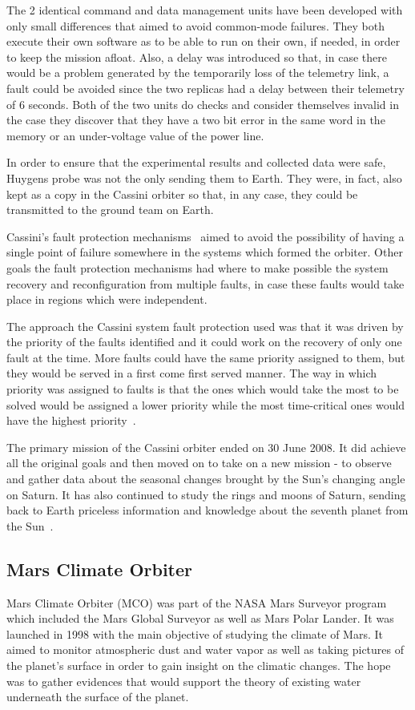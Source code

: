 The 2 identical command and data management units have been developed with only
small differences that aimed to avoid common-mode failures. They both execute
their own software as to be able to run on their own, if needed, in order to
keep the mission afloat. Also, a delay was introduced so that, in case there
would be a problem generated by the temporarily loss of the telemetry link, a
fault could be avoided since the two replicas had a delay between their telemetry
of 6 seconds. Both of the two units do checks and consider themselves invalid in
the case they discover that they have a two bit error in the same word in the
memory or an under-voltage value of the power line.

In order to ensure that the experimental results and collected data were safe,
Huygens probe was not the only sending them to Earth. They were, in fact, also
kept as a copy in the Cassini orbiter so that, in any case, they could be
transmitted to the ground team on Earth.

Cassini's fault protection mechanisms~\cite{cassini} aimed to avoid the
possibility of having a single point of failure somewhere in the systems which
formed the orbiter. Other goals the fault protection mechanisms had where to
make possible the system recovery and reconfiguration from multiple faults, in
case these faults would take place in regions which were independent.

The approach the Cassini system fault protection used was that it was driven by
the priority of the faults identified and it could work on the recovery of only
one fault at the time. More faults could have the same priority assigned to
them, but they would be served in a first come first served manner. The way in
which priority was assigned to faults is that the ones which would take the most
to be solved would be assigned a lower priority while the most time-critical
ones would have the highest priority~\cite{ft-space-avionics}.

The primary mission of the Cassini orbiter ended on 30 June 2008. It did achieve
all the original goals and then moved on to take on a new mission - to observe
and gather data about the seasonal changes brought by the Sun's changing angle
on Saturn. It has also continued to study the rings and moons of Saturn, sending
back to Earth priceless information and knowledge about the seventh planet from
the Sun~\cite{ch-nasa}.

\subsection{Mars Climate Orbiter}
Mars Climate Orbiter (MCO)\cite{mco-nasa} was part of the NASA Mars Surveyor
program which included the Mars Global Surveyor as well as Mars Polar Lander. It
was launched in 1998 with the main objective of studying the climate of Mars. It
aimed to monitor atmospheric dust and water vapor as well as taking pictures of
the planet's surface in order to gain insight on the climatic changes. The hope
was to gather evidences that would support the theory of existing water
underneath the surface of the planet.

